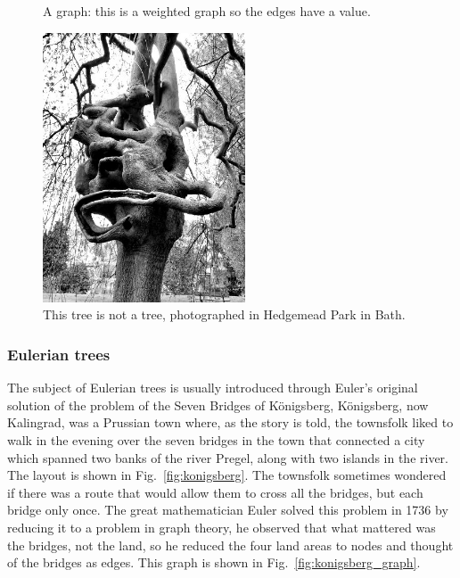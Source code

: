 \documentclass[11pt,a4paper]{scrartcl}
\begin{document}
\begin{figure}
\begin{center}
\end{center}
\caption{A graph: this is a weighted graph so the edges have a value. \label{fig:wei_graph}}
\end{figure}

  

\begin{figure}
\begin{center}
\includegraphics[width=6cm]{not_a_tree_bw.jpg}
\end{center}
\caption{This tree is not a tree, photographed in Hedgemead Park in Bath.\label{fig:not_a_tree}}
\end{figure}

\subsubsection*{Eulerian trees}

The subject of Eulerian trees is usually introduced through Euler's
original solution of the problem of the Seven Bridges of K\"onigsberg,
K\"{o}nigsberg, now Kalingrad, was a Prussian town where, as the story
is told, the townsfolk liked to walk in the evening over the seven
bridges in the town that connected a city which spanned two banks of
the river Pregel, along with two islands in the river. The layout is
shown in Fig.~\ref{fig:konigsberg}. The townsfolk sometimes wondered
if there was a route that would allow them to cross all the bridges,
but each bridge only once. The great mathematician Euler solved this
problem in 1736 by reducing it to a problem in graph theory, he
observed that what mattered was the bridges, not the land, so he
reduced the four land areas to nodes and thought of the bridges as
edges. This graph is shown in Fig.~\ref{fig:konigsberg_graph}.
\end{document}
